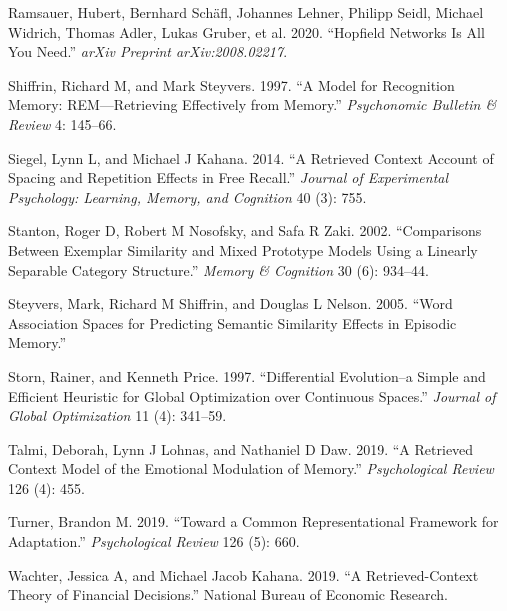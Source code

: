 \documentclass[
  letterpaper,
  11pt,
  english,
  singlespacing,
  headsepline]{MastersDoctoralThesis}
\newlength{\cslhangindent}
\newenvironment{CSLReferences}[2] %
 {\begin{list}{}{%
  \setlength{\itemindent}{0pt}
  \setlength{\leftmargin}{0pt}
  \setlength{\parsep}{0pt}
  \ifodd #1
   \setlength{\leftmargin}{\cslhangindent}
   \setlength{\itemindent}{-1\cslhangindent}
  \fi
  \setlength{\itemsep}{#2\baselineskip}}}
 {\end{list}}
\begin{document}
\begin{CSLReferences}{1}{0}
Ramsauer, Hubert, Bernhard Schäfl, Johannes Lehner, Philipp Seidl,
Michael Widrich, Thomas Adler, Lukas Gruber, et al. 2020. {``Hopfield
Networks Is All You Need.''} \emph{arXiv Preprint arXiv:2008.02217}.

Shiffrin, Richard M, and Mark Steyvers. 1997. {``A Model for Recognition
Memory: REM---Retrieving Effectively from Memory.''} \emph{Psychonomic
Bulletin \& Review} 4: 145--66.

Siegel, Lynn L, and Michael J Kahana. 2014. {``A Retrieved Context
Account of Spacing and Repetition Effects in Free Recall.''}
\emph{Journal of Experimental Psychology: Learning, Memory, and
Cognition} 40 (3): 755.

Stanton, Roger D, Robert M Nosofsky, and Safa R Zaki. 2002.
{``Comparisons Between Exemplar Similarity and Mixed Prototype Models
Using a Linearly Separable Category Structure.''} \emph{Memory \&
Cognition} 30 (6): 934--44.

Steyvers, Mark, Richard M Shiffrin, and Douglas L Nelson. 2005. {``Word
Association Spaces for Predicting Semantic Similarity Effects in
Episodic Memory.''}

Storn, Rainer, and Kenneth Price. 1997. {``Differential Evolution--a
Simple and Efficient Heuristic for Global Optimization over Continuous
Spaces.''} \emph{Journal of Global Optimization} 11 (4): 341--59.

Talmi, Deborah, Lynn J Lohnas, and Nathaniel D Daw. 2019. {``A Retrieved
Context Model of the Emotional Modulation of Memory.''}
\emph{Psychological Review} 126 (4): 455.

Turner, Brandon M. 2019. {``Toward a Common Representational Framework
for Adaptation.''} \emph{Psychological Review} 126 (5): 660.

Wachter, Jessica A, and Michael Jacob Kahana. 2019. {``A
Retrieved-Context Theory of Financial Decisions.''} National Bureau of
Economic Research.

\end{CSLReferences}
\end{document}
